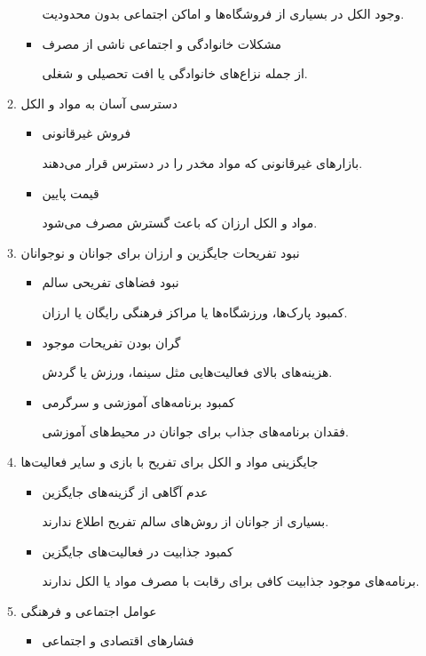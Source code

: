 \documentclass[dvipsnames, svgnames, x11names, 11pt]{article}
\begin{document}
\begin{itemize}
\begin{enumerate}
\begin{itemize}
وجود الکل در بسیاری از فروشگاه‌ها و اماکن اجتماعی بدون محدودیت.  

\item 
مشکلات خانوادگی و اجتماعی ناشی از مصرف

از جمله نزاع‌های خانوادگی یا افت تحصیلی و شغلی.  
\end{itemize}

\item 
دسترسی آسان به مواد و الکل  
\begin{itemize}
\item 
فروش غیرقانونی

بازارهای غیرقانونی که مواد مخدر را در دسترس قرار می‌دهند.  

\item 
قیمت پایین

مواد و الکل ارزان که باعث گسترش مصرف می‌شود.  
\end{itemize}

\item 
نبود تفریحات جایگزین و ارزان برای جوانان و نوجوانان  
\begin{itemize}
\item 
نبود فضاهای تفریحی سالم

کمبود پارک‌ها، ورزشگاه‌ها یا مراکز فرهنگی رایگان یا ارزان.  

\item 
گران بودن تفریحات موجود

هزینه‌های بالای فعالیت‌هایی مثل سینما، ورزش یا گردش.  

\item 
کمبود برنامه‌های آموزشی و سرگرمی

فقدان برنامه‌های جذاب برای جوانان در محیط‌های آموزشی.  
\end{itemize}

\item 
جایگزینی مواد و الکل برای تفریح با بازی و سایر فعالیت‌ها  
\begin{itemize}
\item 
عدم آگاهی از گزینه‌های جایگزین

بسیاری از جوانان از روش‌های سالم تفریح اطلاع ندارند.  

\item 
کمبود جذابیت در فعالیت‌های جایگزین

برنامه‌های موجود جذابیت کافی برای رقابت با مصرف مواد یا الکل ندارند.  
\end{itemize}

\item 
عوامل اجتماعی و فرهنگی  
\begin{itemize}
\item 
فشارهای اقتصادی و اجتماعی


\end{itemize}
\end{enumerate}
\end{itemize}
\end{document}
